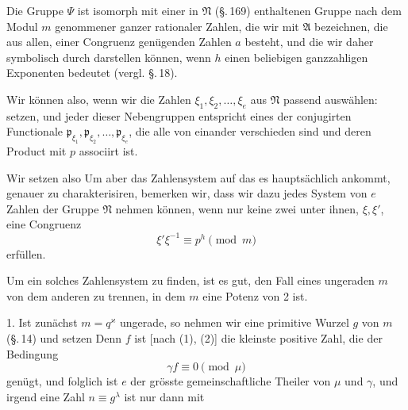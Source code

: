 Die Gruppe $\Psi$ ist isomorph mit einer in $\mathfrak{N}$ (\S.\,169) enthaltenen Gruppe nach dem Modul $m$ genommener ganzer
rationaler Zahlen, die wir mit $\mathfrak{A}$ bezeichnen, die aus allen, einer
Congruenz
gen\"ugenden Zahlen $a$ besteht, und die wir daher symbolisch durch
darstellen k\"onnen, wenn $h$ einen beliebigen ganzzahligen Exponenten bedeutet (vergl. \S.\,18).

Wir k\"onnen also, wenn wir die Zahlen $\xi_1, \xi_2, \ldots, \xi_e$ aus $\mathfrak{N}$
passend ausw\"ahlen:
setzen, und jeder dieser Nebengruppen entspricht eines der conjugirten Functionale $\mathfrak{p}_{\xi_1}, \mathfrak{p}_{\xi_2}, \ldots, \mathfrak{p}_{\xi_e}$, die alle von einander verschieden sind und deren Product mit $p$ associirt ist.

Wir setzen also
Um aber das Zahlensystem
auf das es haupts\"achlich ankommt, genauer zu charakterisiren,
bemerken wir, dass wir dazu jedes System von $e$ Zahlen der
Gruppe $\mathfrak{N}$ nehmen k\"onnen, wenn nur keine zwei unter ihnen,
$\xi, \xi'$, eine Congruenz
\[
\xi'\xi^{-1} \equiv p^h \pmod{m}
\]
erf\"ullen.

Um ein solches Zahlensystem zu finden, ist es gut, den Fall
eines ungeraden $m$ von dem anderen zu trennen, in dem $m$ eine
Potenz von 2 ist.

1. Ist zun\"achst $m = q^{\varkappa}$ ungerade, so nehmen wir eine
primitive Wurzel $g$ von $m$ (\S.\,14) und setzen
Denn $f$ ist [nach (1), (2)] die kleinste positive Zahl, die der
Bedingung
\[
\gamma f \equiv 0 \pmod{\mu}
\]
gen\"ugt, und folglich ist $e$ der gr\"osste gemeinschaftliche Theiler
von $\mu$ und $\gamma$, und irgend eine Zahl $n \equiv g^{\lambda}$ ist nur dann mit
